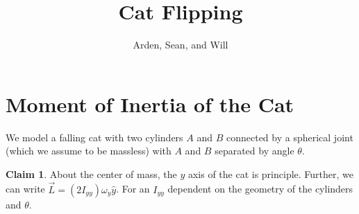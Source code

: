 \documentclass[12]{amsart}
\theoremstyle{definition}
\newtheorem{claim}[theorem]{Claim}
\begin{document}
    \title{Cat Flipping}
    \author{Arden, Sean, and Will}
    \maketitle
    
    \section{Moment of Inertia of the Cat}
    We model a falling cat with two cylinders $A$ and $B$ connected by a spherical joint (which we assume to be massless) with $A$ and $B$ separated by angle $\theta$.

    \begin{claim}
        About the center of mass, the $y$ axis of the cat is principle. Further, we can write $\vec{L} = (2I_{yy})\omega_y\hat{y}$. For an $I_{yy}$ dependent on the geometry of the cylinders and $\theta$.
    \end{claim}
\end{document}
